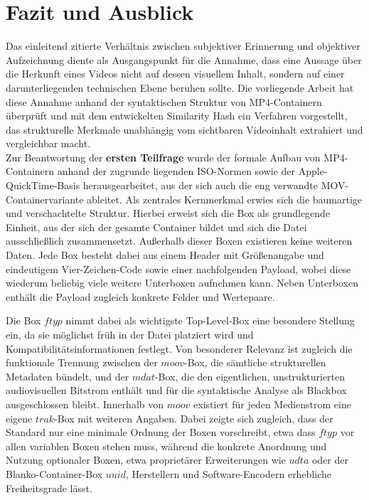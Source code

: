 \chapter{Fazit und Ausblick}
\label{sec:fazit}

Das einleitend zitierte Verhältnis zwischen subjektiver Erinnerung und objektiver Aufzeichnung diente als Ausgangspunkt für die Annahme, dass eine Aussage über die Herkunft eines Videos nicht auf dessen visuellem Inhalt, sondern auf einer darunterliegenden technischen Ebene beruhen sollte. Die vorliegende Arbeit hat diese Annahme anhand der syntaktischen Struktur von MP4-Containern überprüft und mit dem entwickelten Similarity Hash ein Verfahren vorgestellt, das strukturelle Merkmale unabhängig vom sichtbaren Videoinhalt extrahiert und vergleichbar macht.\\


Zur Beantwortung der \textbf{ersten Teilfrage} wurde der formale Aufbau von MP4-Containern anhand der zugrunde liegenden ISO-Normen sowie der Apple-QuickTime-Basis herausgearbeitet, aus der sich auch die eng verwandte MOV-Containervariante ableitet. Als zentrales Kernmerkmal erwies sich die baumartige und verschachtelte Struktur. Hierbei erweist sich die Box als grundlegende Einheit, aus der sich der gesamte Container bildet und sich die Datei ausschließlich zusammensetzt. Außerhalb dieser Boxen existieren keine weiteren Daten. Jede Box besteht dabei aus einem Header mit Größenangabe und eindeutigem Vier-Zeichen-Code sowie einer nachfolgenden Payload, wobei diese wiederum beliebig viele weitere Unterboxen aufnehmen kann. Neben Unterboxen enthält die Payload zugleich konkrete Felder und Wertepaare.

Die Box \(ftyp\) nimmt dabei als wichtigste Top-Level-Box eine besondere Stellung ein, da sie möglichst früh in der Datei platziert wird und Kompatibilitätsinformationen festlegt. Von besonderer Relevanz ist zugleich die funktionale Trennung zwischen der \(moov\)-Box, die sämtliche strukturellen Metadaten bündelt, und der \(mdat\)-Box, die den eigentlichen, unstrukturierten audiovisuellen Bitstrom enthält und für die syntaktische Analyse als Blackbox ausgeschlossen bleibt. Innerhalb von \(moov\) existiert für jeden Medienstrom eine eigene \(trak\)-Box mit weiteren Angaben. Dabei zeigte sich zugleich, dass der Standard nur eine minimale Ordnung der Boxen vorschreibt, etwa dass \(ftyp\) vor allen variablen Boxen stehen muss, während die konkrete Anordnung und Nutzung optionaler Boxen, etwa proprietärer Erweiterungen wie \(udta\) oder der Blanko-Container-Box \(uuid\), Herstellern und Software-Encodern erhebliche Freiheitsgrade lässt.\\


